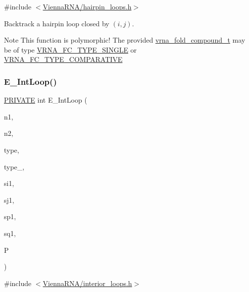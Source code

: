 {\ttfamily \#include $<$\mbox{\hyperlink{hairpin__loops_8h}{Vienna\+R\+N\+A/hairpin\+\_\+loops.\+h}}$>$}



Backtrack a hairpin loop closed by $ (i,j) $. 

\begin{DoxyNote}{Note}
This function is polymorphic! The provided \mbox{\hyperlink{group__fold__compound_ga1b0cef17fd40466cef5968eaeeff6166}{vrna\+\_\+fold\+\_\+compound\+\_\+t}} may be of type \mbox{\hyperlink{group__fold__compound_gga01a4ff86fa71deaaa5d1abbd95a1447da7e264dd3cf2dc9b6448caabcb7763cd6}{V\+R\+N\+A\+\_\+\+F\+C\+\_\+\+T\+Y\+P\+E\+\_\+\+S\+I\+N\+G\+LE}} or \mbox{\hyperlink{group__fold__compound_gga01a4ff86fa71deaaa5d1abbd95a1447dab821ce46ea3cf665be97df22a76f5023}{V\+R\+N\+A\+\_\+\+F\+C\+\_\+\+T\+Y\+P\+E\+\_\+\+C\+O\+M\+P\+A\+R\+A\+T\+I\+VE}} 
\end{DoxyNote}
\mbox{\label{group__loops_gaafbc187b7f78e8e82afb77dd6f3b8fc5}} 
\subsubsection{\texorpdfstring{E\+\_\+\+Int\+Loop()}{E\_IntLoop()}}
{\footnotesize\ttfamily \mbox{\hyperlink{group__utils_ga5e151c615eda34903514212f05a5ccf8}{P\+R\+I\+V\+A\+TE}} int E\+\_\+\+Int\+Loop (\begin{DoxyParamCaption}\item[{int}]{n1,  }\item[{int}]{n2,  }\item[{int}]{type,  }\item[{int}]{type\+\_,  }\item[{int}]{si1,  }\item[{int}]{sj1,  }\item[{int}]{sp1,  }\item[{int}]{sq1,  }\item[{\mbox{\hyperlink{group__energy__parameters_ga8a69ca7d787e4fd6079914f5343a1f35}{vrna\+\_\+param\+\_\+t}} $\ast$}]{P }\end{DoxyParamCaption})}



{\ttfamily \#include $<$\mbox{\hyperlink{interior__loops_8h}{Vienna\+R\+N\+A/interior\+\_\+loops.\+h}}$>$}


